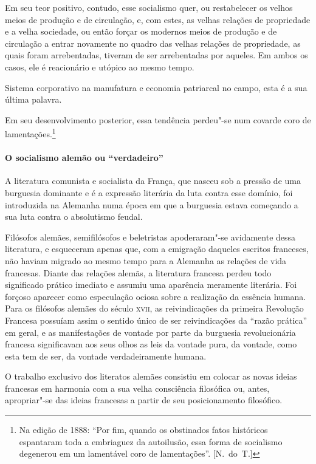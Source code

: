 Em seu teor positivo, contudo, esse socialismo quer, ou restabelecer os
velhos meios de produção e de circulação, e, com estes, as velhas
relações de propriedade e a velha sociedade, ou então forçar os
modernos meios de produção e de circulação a entrar novamente no quadro
das velhas relações de propriedade, as quais foram arrebentadas,
tiveram de ser arrebentadas por aqueles. Em ambos os casos, ele é
reacionário e utópico ao mesmo tempo.

Sistema corporativo na manufatura e economia patriarcal no campo, esta é
a sua última palavra.

Em seu desenvolvimento posterior, essa tendência perdeu"-se num
covarde coro de lamentações.\footnote{ Na edição de 1888: “Por fim, quando os obstinados fatos 		
históricos espantaram toda a embriaguez da autoilusão, essa forma de
socialismo degenerou em um lamentável coro de lamentações”. [N.~do~T.]}

\paragraph{O socialismo alemão ou “verdadeiro”}

A literatura comunista e socialista da França, que nasceu sob a pressão
de uma burguesia dominante e é a expressão literária da luta contra
esse domínio, foi introduzida na Alemanha numa época em que a burguesia
estava começando a sua luta contra o absolutismo feudal.

Filósofos alemães, semifilósofos e beletristas apoderaram"-se
avidamente dessa literatura, e esqueceram apenas que, com a emigração
daqueles escritos franceses, não haviam migrado ao mesmo tempo para a
Alemanha as relações de vida francesas. Diante das relações alemãs, a
literatura francesa perdeu todo significado prático imediato e assumiu
uma aparência meramente literária. Foi forçoso aparecer como
especulação ociosa sobre a realização da essência humana. Para os
filósofos alemães do século \textsc{xvii}, as reivindicações da primeira
Revolução Francesa possuíam assim o sentido único de ser reivindicações
da “razão prática” em geral, e as manifestações de vontade por parte da
burguesia revolucionária francesa significavam aos seus olhos as leis
da vontade pura, da vontade, como esta tem de ser, da vontade
verdadeiramente humana.

O trabalho exclusivo dos literatos alemães consistiu em colocar as novas
ideias francesas em harmonia com a sua velha consciência filosófica ou,
antes, apropriar"-se das ideias francesas a partir de seu
posicionamento filosófico.

